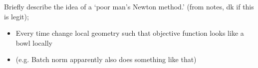\documentclass{article}
\begin{document}

Briefly describe the idea of a `poor man's Newton method.' (from notes, dk if this is legit); \begin{itemize}
    \item Every time change local geometry such that objective function looks like a bowl locally
    \item (e.g. Batch norm apparently also does something like that)
\end{itemize}
\end{document}
